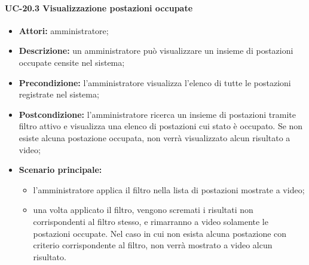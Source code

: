 \paragraph{UC-20.3 Visualizzazione postazioni occupate}
\begin{itemize}
    \item \textbf{Attori:} amministratore;
    \item \textbf{Descrizione:} un amministratore pu\`{o} visualizzare un insieme di postazioni occupate censite nel sistema;
    \item \textbf{Precondizione:} l'amministratore visualizza l'elenco di tutte le postazioni registrate nel sistema;
    \item \textbf{Postcondizione:} l'amministratore ricerca un insieme di postazioni tramite filtro attivo e visualizza una elenco di postazioni cui stato è occupato. Se non esiste alcuna postazione occupata, non verrà visualizzato alcun risultato a video;
    \item \textbf{Scenario principale:}
    \begin{itemize}
        \item l'amministratore applica il filtro nella lista di postazioni mostrate a video;
        \item una volta applicato il filtro, vengono scremati i risultati non corrispondenti al filtro stesso, e rimarranno a video solamente le postazioni occupate. Nel caso in cui non esista alcuna postazione con criterio corrispondente al filtro, non verrà mostrato a video alcun risultato.
    \end{itemize}
\end{itemize}

